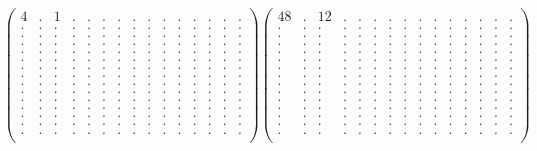\documentclass[12pt,a4paper]{amsart}
\begin{document}
\begin{align*}
\left(\begin{array}{rrrrrrrrrrrrrrr}%
4&.&1&.&.&.&.&.&.&.&.&.&.&.&.\\%
.&.&.&.&.&.&.&.&.&.&.&.&.&.&.\\%
.&.&.&.&.&.&.&.&.&.&.&.&.&.&.\\%
.&.&.&.&.&.&.&.&.&.&.&.&.&.&.\\%
.&.&.&.&.&.&.&.&.&.&.&.&.&.&.\\%
.&.&.&.&.&.&.&.&.&.&.&.&.&.&.\\%
.&.&.&.&.&.&.&.&.&.&.&.&.&.&.\\%
.&.&.&.&.&.&.&.&.&.&.&.&.&.&.\\%
.&.&.&.&.&.&.&.&.&.&.&.&.&.&.\\%
.&.&.&.&.&.&.&.&.&.&.&.&.&.&.\\%
.&.&.&.&.&.&.&.&.&.&.&.&.&.&.\\%
.&.&.&.&.&.&.&.&.&.&.&.&.&.&.\\%
.&.&.&.&.&.&.&.&.&.&.&.&.&.&.\\%
.&.&.&.&.&.&.&.&.&.&.&.&.&.&.\\%
.&.&.&.&.&.&.&.&.&.&.&.&.&.&.\\%
\end{array}\right)%
\left(\begin{array}{rrrrrrrrrrrrrrr}%
48&.&12&.&.&.&.&.&.&.&.&.&.&.&.\\%
.&.&.&.&.&.&.&.&.&.&.&.&.&.&.\\%
.&.&.&.&.&.&.&.&.&.&.&.&.&.&.\\%
.&.&.&.&.&.&.&.&.&.&.&.&.&.&.\\%
.&.&.&.&.&.&.&.&.&.&.&.&.&.&.\\%
.&.&.&.&.&.&.&.&.&.&.&.&.&.&.\\%
.&.&.&.&.&.&.&.&.&.&.&.&.&.&.\\%
.&.&.&.&.&.&.&.&.&.&.&.&.&.&.\\%
.&.&.&.&.&.&.&.&.&.&.&.&.&.&.\\%
.&.&.&.&.&.&.&.&.&.&.&.&.&.&.\\%
.&.&.&.&.&.&.&.&.&.&.&.&.&.&.\\%
.&.&.&.&.&.&.&.&.&.&.&.&.&.&.\\%
.&.&.&.&.&.&.&.&.&.&.&.&.&.&.\\%
.&.&.&.&.&.&.&.&.&.&.&.&.&.&.\\%
.&.&.&.&.&.&.&.&.&.&.&.&.&.&.\\%
\end{array}\right)%
\end{align*}
\end{document}

